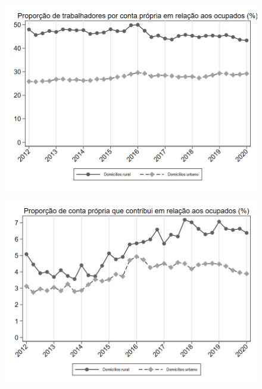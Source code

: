 \begin{frame}[label=_composicao_demografica_rural_urbano_prop_cpropria]{}
\textit{\hyperlink{_composicao_demografica_rural_urbano}{}}
\begin{figure}
  \centering
  \includegraphics[width=1.0\linewidth]{../../analysis/output/composicao_demografica/area_geografica/_composicao_demografica_rural_urbano_prop_cpropria.png}
  \caption{}
  \label{fig:_composicao_demografica_rural_urbano_prop_cpropria}
\end{figure}
\end{frame}

\begin{frame}[label=_composicao_demografica_rural_urbano_prop_cpropriaC]{}
\textit{\hyperlink{_composicao_demografica_rural_urbano}{}}
\begin{figure}
  \centering
  \includegraphics[width=1.0\linewidth]{../../analysis/output/composicao_demografica/area_geografica/_composicao_demografica_rural_urbano_prop_cpropriaC.png}
  \caption{}
  \label{fig:_composicao_demografica_rural_urbano_prop_cpropriaC}
\end{figure}
\end{frame}


